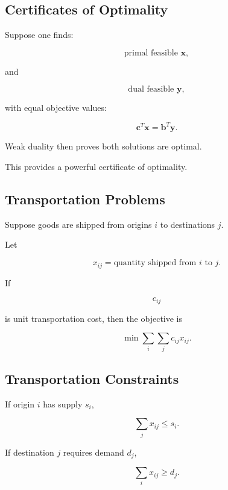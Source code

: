\subsection{Certificates of Optimality}
\label{subsec:lp-certificates-optimality}

Suppose one finds:

\[
\boxed{
\text{primal feasible }\mathbf{x},
}
\]

and

\[
\boxed{
\text{dual feasible }\mathbf{y},
}
\]

with equal objective values:

\[
\boxed{
\mathbf{c}^T\mathbf{x}
=
\mathbf{b}^T\mathbf{y}.
}
\]

Weak duality then proves both solutions are optimal.

This provides a powerful certificate of optimality.

\subsection{Transportation Problems}
\label{subsec:transportation-problems}

Suppose goods are shipped from origins \(i\) to destinations \(j\).

Let

\[
x_{ij}
=
\text{quantity shipped from }i\text{ to }j.
\]

If

\[
c_{ij}
\]

is unit transportation cost, then the objective is

\[
\boxed{
\min
\sum_i
\sum_j
c_{ij}x_{ij}.
}
\]

\subsection{Transportation Constraints}
\label{subsec:transportation-constraints}

If origin \(i\) has supply \(s_i\),

\[
\boxed{
\sum_j
x_{ij}
\leq
s_i.
}
\]

If destination \(j\) requires demand \(d_j\),

\[
\boxed{
\sum_i
x_{ij}
\geq
d_j.
}
\]

